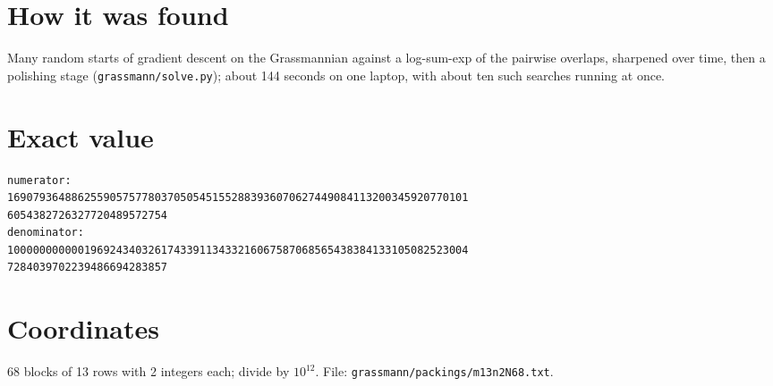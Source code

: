 \documentclass[11pt,a4paper]{article}
\begin{document}
\section{How it was found}
Many random starts of gradient descent on the Grassmannian against a log-sum-exp of the pairwise overlaps, sharpened over time, then a polishing stage (\texttt{grassmann/solve.py}); about 144 seconds on one laptop, with about ten such searches running at once.


\appendix
\section{Exact value}
{\small
\begin{verbatim}
numerator:
169079364886255905757780370505451552883936070627449084113200345920770101
6054382726327720489572754
denominator:
100000000000196924340326174339113433216067587068565438384133105082523004
7284039702239486694283857
\end{verbatim}}

\section{Coordinates}
68 blocks of 13 rows with 2 integers each; divide by $10^{12}$. File: \texttt{grassmann/packings/m13n2N68.txt}.
{\tiny
\begin{multicols}{4}
\end{multicols}}
\end{document}
